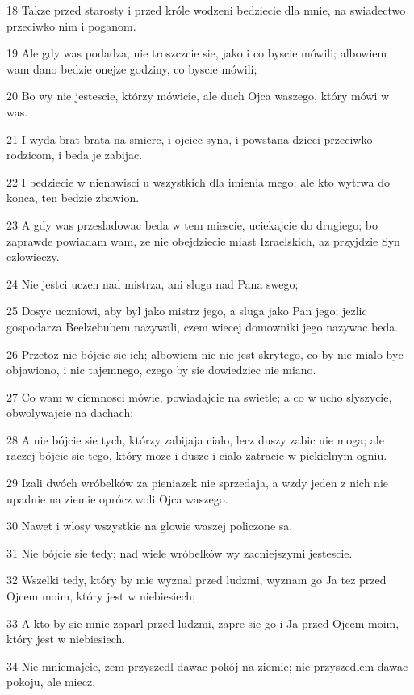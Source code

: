 \par 18 Takze przed starosty i przed króle wodzeni bedziecie dla mnie, na swiadectwo przeciwko nim i poganom.
\par 19 Ale gdy was podadza, nie troszczcie sie, jako i co byscie mówili; albowiem wam dano bedzie onejze godziny, co byscie mówili;
\par 20 Bo wy nie jestescie, którzy mówicie, ale duch Ojca waszego, który mówi w was.
\par 21 I wyda brat brata na smierc, i ojciec syna, i powstana dzieci przeciwko rodzicom, i beda je zabijac.
\par 22 I bedziecie w nienawisci u wszystkich dla imienia mego; ale kto wytrwa do konca, ten bedzie zbawion.
\par 23 A gdy was przesladowac beda w tem miescie, uciekajcie do drugiego; bo zaprawde powiadam wam, ze nie obejdziecie miast Izraelskich, az przyjdzie Syn czlowieczy.
\par 24 Nie jestci uczen nad mistrza, ani sluga nad Pana swego;
\par 25 Dosyc uczniowi, aby byl jako mistrz jego, a sluga jako Pan jego; jezlic gospodarza Beelzebubem nazywali, czem wiecej domowniki jego nazywac beda.
\par 26 Przetoz nie bójcie sie ich; albowiem nic nie jest skrytego, co by nie mialo byc objawiono, i nic tajemnego, czego by sie dowiedziec nie miano.
\par 27 Co wam w ciemnosci mówie, powiadajcie na swietle; a co w ucho slyszycie, obwolywajcie na dachach;
\par 28 A nie bójcie sie tych, którzy zabijaja cialo, lecz duszy zabic nie moga; ale raczej bójcie sie tego, który moze i dusze i cialo zatracic w piekielnym ogniu.
\par 29 Izali dwóch wróbelków za pieniazek nie sprzedaja, a wzdy jeden z nich nie upadnie na ziemie oprócz woli Ojca waszego.
\par 30 Nawet i wlosy wszystkie na glowie waszej policzone sa.
\par 31 Nie bójcie sie tedy; nad wiele wróbelków wy zacniejszymi jestescie.
\par 32 Wszelki tedy, który by mie wyznal przed ludzmi, wyznam go Ja tez przed Ojcem moim, który jest w niebiesiech;
\par 33 A kto by sie mnie zaparl przed ludzmi, zapre sie go i Ja przed Ojcem moim, który jest w niebiesiech.
\par 34 Nie mniemajcie, zem przyszedl dawac pokój na ziemie; nie przyszedlem dawac pokoju, ale miecz.
